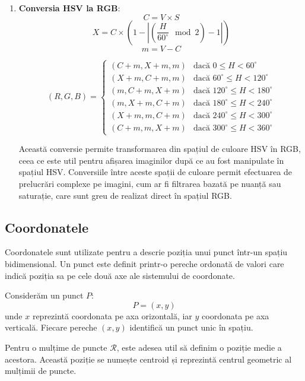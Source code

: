 \begin{enumerate}
    \item \textbf{Conversia HSV la RGB}:
          \[
              C = V \times S
          \]
          \[
              X = C \times (1 - \left| \left(\frac{H}{60^\circ} \mod 2 \right) - 1 \right|)
          \]
          \[
              m = V - C
          \]

          \[
              (R, G, B) = \begin{cases}
                  (C+m, X+m, m) & \text{dacă } 0 \leq H < 60^\circ          \\
                  (X+m, C+m, m) & \text{dacă } 60^\circ \leq H < 120^\circ  \\
                  (m, C+m, X+m) & \text{dacă } 120^\circ \leq H < 180^\circ \\
                  (m, X+m, C+m) & \text{dacă } 180^\circ \leq H < 240^\circ \\
                  (X+m, m, C+m) & \text{dacă } 240^\circ \leq H < 300^\circ \\
                  (C+m, m, X+m) & \text{dacă } 300^\circ \leq H < 360^\circ
              \end{cases}
          \]

          Această conversie permite transformarea din spațiul de culoare HSV în RGB, ceea ce este util pentru afișarea imaginilor după ce au fost manipulate în spațiul HSV. Conversiile între aceste spații de culoare permit efectuarea de prelucrări complexe pe imagini, cum ar fi filtrarea bazată pe nuanță sau saturație, care sunt greu de realizat direct în spațiul RGB.
\end{enumerate}

\subsection*{Coordonatele}

Coordonatele sunt utilizate pentru a descrie poziția unui punct într-un spațiu bidimensional. Un punct este definit printr-o pereche ordonată de valori care indică poziția sa pe cele două axe ale sistemului de coordonate.

Considerăm un punct \( P \):
\[
    P = (x, y)
\]
unde \( x \) reprezintă coordonata pe axa orizontală, iar \( y \) coordonata pe axa verticală. Fiecare pereche \((x, y)\) identifică un punct unic în spațiu.

Pentru o mulțime de puncte \( \mathcal{R} \), este adesea util să definim o poziție medie a acestora. Această poziție se numește centroid și reprezintă centrul geometric al mulțimii de puncte.

